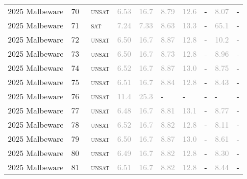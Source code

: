 \begin{center}
{\begin{longtable}{@{}llllllllll@{}}
2025 Malbeware & 70 & ~\textsc{unsat} & \textcolor{darkgray}{6.53} & \textcolor{darkgray}{16.7} & \textcolor{darkgray}{8.79} & \textcolor{darkgray}{12.6} & - & \textcolor{darkgray}{8.07} & - \\
2025 Malbeware & 71 & ~\textsc{sat} & \textcolor{darkgray}{7.24} & \textcolor{darkgray}{7.33} & \textcolor{darkgray}{8.63} & \textcolor{darkgray}{13.3} & - & \textcolor{darkgray}{65.1} & - \\
2025 Malbeware & 72 & ~\textsc{unsat} & \textcolor{darkgray}{6.50} & \textcolor{darkgray}{16.7} & \textcolor{darkgray}{8.87} & \textcolor{darkgray}{12.8} & - & \textcolor{darkgray}{10.2} & - \\
2025 Malbeware & 73 & ~\textsc{unsat} & \textcolor{darkgray}{6.50} & \textcolor{darkgray}{16.7} & \textcolor{darkgray}{8.73} & \textcolor{darkgray}{12.8} & - & \textcolor{darkgray}{8.96} & - \\
2025 Malbeware & 74 & ~\textsc{unsat} & \textcolor{darkgray}{6.52} & \textcolor{darkgray}{16.7} & \textcolor{darkgray}{8.87} & \textcolor{darkgray}{13.0} & - & \textcolor{darkgray}{8.75} & - \\
2025 Malbeware & 75 & ~\textsc{unsat} & \textcolor{darkgray}{6.51} & \textcolor{darkgray}{16.7} & \textcolor{darkgray}{8.84} & \textcolor{darkgray}{12.8} & - & \textcolor{darkgray}{8.43} & - \\
2025 Malbeware & 76 & ~\textsc{unsat} & \textcolor{darkgray}{11.4} & \textcolor{darkgray}{25.3} & - & - & - & - & - \\
2025 Malbeware & 77 & ~\textsc{unsat} & \textcolor{darkgray}{6.48} & \textcolor{darkgray}{16.7} & \textcolor{darkgray}{8.81} & \textcolor{darkgray}{13.1} & - & \textcolor{darkgray}{8.77} & - \\
2025 Malbeware & 78 & ~\textsc{unsat} & \textcolor{darkgray}{6.52} & \textcolor{darkgray}{16.7} & \textcolor{darkgray}{8.82} & \textcolor{darkgray}{12.8} & - & \textcolor{darkgray}{8.11} & - \\
2025 Malbeware & 79 & ~\textsc{unsat} & \textcolor{darkgray}{6.50} & \textcolor{darkgray}{16.7} & \textcolor{darkgray}{8.87} & \textcolor{darkgray}{13.0} & - & \textcolor{darkgray}{8.61} & - \\
2025 Malbeware & 80 & ~\textsc{unsat} & \textcolor{darkgray}{6.49} & \textcolor{darkgray}{16.7} & \textcolor{darkgray}{8.82} & \textcolor{darkgray}{12.8} & - & \textcolor{darkgray}{8.30} & - \\
2025 Malbeware & 81 & ~\textsc{unsat} & \textcolor{darkgray}{6.51} & \textcolor{darkgray}{16.7} & \textcolor{darkgray}{8.82} & \textcolor{darkgray}{12.8} & - & \textcolor{darkgray}{8.44} & - \\

\end{longtable}}
\end{center}
